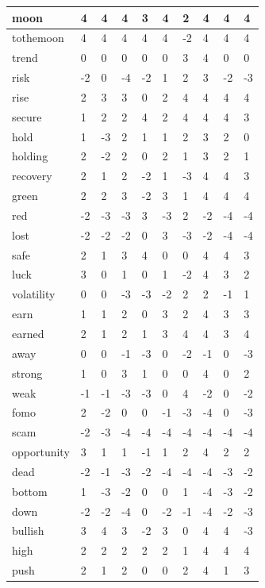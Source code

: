 \documentclass[a4paper,11pt,oneside]{article}
\begin{document}
\begin{center}
\begin{longtable}{| l | l | l | l | l | l | l | l | l | l |}
  	\hline \hline
  	\endlastfoot
  		\hline
  		moon & 4 & 4 & 4 & 3 & 4 & 2 & 4 & 4 & 4 \\
  		\hline
  		tothemoon & 4 & 4 & 4 & 4 & 4 & -2 & 4 & 4 & 4 \\
  		\hline
  		trend & 0 & 0 & 0 & 0 & 0 & 3 & 4 & 0 & 0 \\
  		\hline
  		risk & -2 & 0 & -4 & -2 & 1 & 2 & 3 & -2 & -3 \\
  		\hline
  		rise & 2 & 3 & 3 & 0 & 2 & 4 & 4 & 4 & 4 \\
  		\hline
  		secure & 1 & 2 & 2 & 4 & 2 & 4 & 4 & 4 & 3 \\
  		\hline
  		hold & 1 & -3 & 2 & 1 & 1 & 2 & 3 & 2 & 0 \\
  		\hline
  		holding & 2 &-2&2&0&2&1&3&2&1\\
  		\hline
  		recovery &2&1&2&-2&1&-3&4&4&3 \\
  		\hline
  		green & 2&2&3&-2&3&1&4&4&4 \\
  		\hline
  		red &-2&-3&-3&3&-3&2&-2&-4&-4 \\
  		\hline
  		lost & -2&-2&-2&0&3&-3&-2&-4&-4\\
  		\hline
  		safe & 2&1&3&4&0&0&4&4&3\\
  		\hline
  		luck & 3&0&1&0&1&-2&4&3&2\\
  		\hline
  		volatility & 0 &0&-3&-3&-2&2&2&-1&1\\
  		\hline
  		earn & 1&1&2&0&3&2&4&3&3\\
  		\hline
  		earned & 2&1&2&1&3&4&4&3&4 \\
  		\hline
  		away & 0 &0&-1&-3&0&-2&-1&0&-3\\
  		\hline
  		strong &1&0&3&1&0&0&4&0&2 \\
  		\hline
  		weak & -1&-1&-3&-3&0&4&-2&0&-2\\
  		\hline
  		fomo & 2&-2&0&0&-1&-3&-4&0&-3\\
  		\hline
  		scam &  -2&-3&-4&-4&-4&-4&-4&-4&-4 \\
  		\hline
  		opportunity & 3&1&1&-1&1&2&4&2&2\\
  		\hline
  		dead & -2&-1&-3&-2&-4&-4&-4&-3&-2\\
  		\hline
  		bottom & 1&-3&-2&0&0&1&-4&-3&-2\\
  		\hline
  		down & -2&-2&-4&0&-2&-1&-4&-2&-3\\
  		\hline
  		bullish & 3&4&3&-2&3&0&4&4&-3\\
  		\hline
  		high & 2&2&2&2&2&1&4&4&4\\
  		\hline
  		push &2&1&2&0&0&2&4&1&3 \\

\end{longtable}
\end{center}
\end{document}
